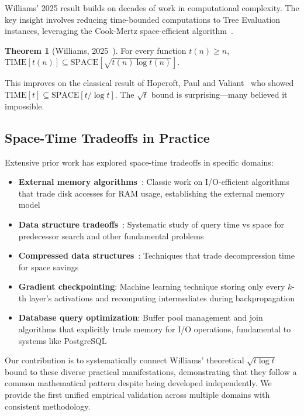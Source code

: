 \documentclass[11pt]{article}
\theoremstyle{definition}
\newtheorem{theorem}{Theorem}
\begin{document}
Williams' 2025 result builds on decades of work in computational complexity. The key insight involves reducing time-bounded computations to Tree Evaluation instances, leveraging the Cook-Mertz space-efficient algorithm~\cite{cookmertz2024}.

\begin{theorem}[Williams, 2025~\cite{williams2025}]
For every function $t(n) \geq n$,\\
$\text{TIME}[t(n)] \subseteq \text{SPACE}[\sqrt{t(n) \log t(n)}]$.
\end{theorem}

This improves on the classical result of Hopcroft, Paul and Valiant~\cite{hpv1977} who showed $\text{TIME}[t] \subseteq \text{SPACE}[t/\log t]$. The $\sqrt{t}$ bound is surprising---many believed it impossible.

\subsection{Space-Time Tradeoffs in Practice}

Extensive prior work has explored space-time tradeoffs in specific domains:
\begin{itemize}
\item \textbf{External memory algorithms}~\cite{vitter2008}: Classic work on I/O-efficient algorithms that trade disk accesses for RAM usage, establishing the external memory model
\item \textbf{Data structure tradeoffs}~\cite{patrascu2006}: Systematic study of query time vs space for predecessor search and other fundamental problems
\item \textbf{Compressed data structures}~\cite{navarro2016}: Techniques that trade decompression time for space savings
\item \textbf{Gradient checkpointing}: Machine learning technique storing only every $k$-th layer's activations and recomputing intermediates during backpropagation
\item \textbf{Database query optimization}: Buffer pool management and join algorithms that explicitly trade memory for I/O operations, fundamental to systems like PostgreSQL
\end{itemize}

Our contribution is to systematically connect Williams' theoretical $\sqrt{t \log t}$ bound to these diverse practical manifestations, demonstrating that they follow a common mathematical pattern despite being developed independently. We provide the first unified empirical validation across multiple domains with consistent methodology.
\end{document}
